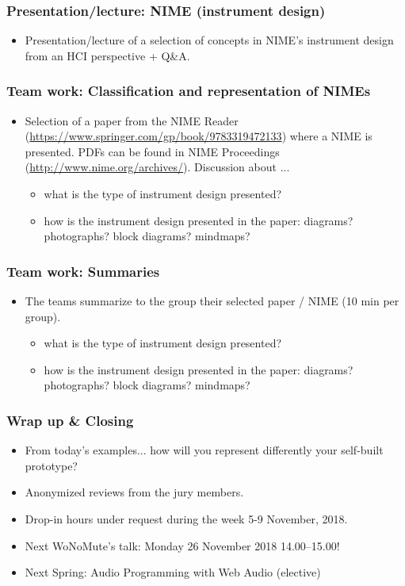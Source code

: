 \documentclass[screen, aspectratio=43]{beamer}
\begin{document}
%
\begin{frame}
\frametitle{Presentation/lecture: NIME (instrument design)}
\begin{itemize}
\item Presentation/lecture of a selection of concepts in NIME's instrument design from an HCI perspective + Q\&A.
\end{itemize}
\end{frame}
%
\begin{frame}
\frametitle{Team work: Classification and representation of NIMEs}
\begin{itemize}
\item Selection of a paper from the NIME Reader (\url{https://www.springer.com/gp/book/9783319472133}) where a NIME is presented. PDFs can be found in NIME Proceedings (\url{http://www.nime.org/archives/}).
Discussion about ... 
\begin{itemize}
\item what is the type of instrument design presented?
\item how is the instrument design presented in the paper: diagrams? photographs? block diagrams?
 mindmaps?
\end{itemize}
\end{itemize}
\end{frame}
%
\begin{frame}
\frametitle{Team work: Summaries}
\begin{itemize}
\item The teams summarize to the group their selected paper / NIME (10 min per group). 
\begin{itemize}
\item what is the type of instrument design presented?
\item how is the instrument design presented in the paper: diagrams? photographs? block diagrams? mindmaps?
\end{itemize}
\end{itemize}
\end{frame}
%
\begin{frame}
\frametitle{Wrap up \& Closing}
\begin{itemize}
\item From today's examples... how will you represent differently your self-built prototype?
\item Anonymized reviews from the jury members.
\item Drop-in hours under request during the week 5-9 November, 2018.
\item Next WoNoMute's talk: Monday 26 November 2018 14.00--15.00!
\item Next Spring: Audio Programming with Web Audio (elective)
\end{itemize}
\end{frame}
%
\end{document}
